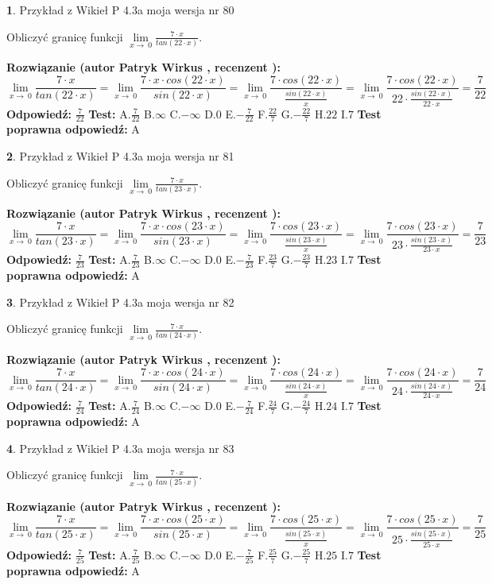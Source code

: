 \documentclass[12pt, a4paper]{article}
\theoremstyle{definition} %
\newtheorem{zad}{}
\newcommand{\zadStart}[1]{\begin{zad}#1\newline}
\newcommand{\zadStop}{\end{zad}}
\newcommand{\rozwStart}[2]{\noindent \textbf{Rozwiązanie (autor #1 , recenzent #2): }\newline}
\newcommand{\rozwStop}{\newline}
\newcommand{\odpStart}{\noindent \textbf{Odpowiedź:}\newline}
\newcommand{\odpStop}{\newline}
\newcommand{\testStart}{\noindent \textbf{Test:}\newline}
\newcommand{\testStop}{\newline}
\newcommand{\kluczStart}{\noindent \textbf{Test poprawna odpowiedź:}\newline}
\newcommand{\kluczStop}{\newline}
\begin{document}
\zadStart{Przykład z Wikieł P 4.3a moja wersja nr 80}


Obliczyć granicę funkcji $\lim\limits_{x\to\ 0}\frac{7 \cdot x}{tan(22 \cdot x)}$.
\zadStop
\rozwStart{Patryk Wirkus}{}
$$\lim\limits_{x\to\ 0}\frac{7 \cdot x}{tan(22 \cdot x)}=\lim\limits_{x\to\ 0}\frac{7 \cdot x \cdot cos(22 \cdot x)}{sin(22 \cdot x)}=\lim\limits_{x\to\ 0}\frac{7 \cdot cos(22 \cdot x)}{\frac{sin(22 \cdot x)}{x}}=\lim\limits_{x\to\ 0}\frac{7 \cdot cos(22 \cdot x)}{22 \cdot \frac{sin(22 \cdot x)}{22 \cdot x}} = \frac{7}{22}$$
\rozwStop
\odpStart
$\frac{7}{22}$
\odpStop
\testStart
A.$\frac{7}{22}$
B.$\infty$
C.$-\infty$
D.$0$
E.$-\frac{7}{22}$
F.$\frac{22}{7}$
G.$-\frac{22}{7}$
H.$22$
I.$7$
\testStop
\kluczStart
A
\kluczStop



\zadStart{Przykład z Wikieł P 4.3a moja wersja nr 81}


Obliczyć granicę funkcji $\lim\limits_{x\to\ 0}\frac{7 \cdot x}{tan(23 \cdot x)}$.
\zadStop
\rozwStart{Patryk Wirkus}{}
$$\lim\limits_{x\to\ 0}\frac{7 \cdot x}{tan(23 \cdot x)}=\lim\limits_{x\to\ 0}\frac{7 \cdot x \cdot cos(23 \cdot x)}{sin(23 \cdot x)}=\lim\limits_{x\to\ 0}\frac{7 \cdot cos(23 \cdot x)}{\frac{sin(23 \cdot x)}{x}}=\lim\limits_{x\to\ 0}\frac{7 \cdot cos(23 \cdot x)}{23 \cdot \frac{sin(23 \cdot x)}{23 \cdot x}} = \frac{7}{23}$$
\rozwStop
\odpStart
$\frac{7}{23}$
\odpStop
\testStart
A.$\frac{7}{23}$
B.$\infty$
C.$-\infty$
D.$0$
E.$-\frac{7}{23}$
F.$\frac{23}{7}$
G.$-\frac{23}{7}$
H.$23$
I.$7$
\testStop
\kluczStart
A
\kluczStop



\zadStart{Przykład z Wikieł P 4.3a moja wersja nr 82}


Obliczyć granicę funkcji $\lim\limits_{x\to\ 0}\frac{7 \cdot x}{tan(24 \cdot x)}$.
\zadStop
\rozwStart{Patryk Wirkus}{}
$$\lim\limits_{x\to\ 0}\frac{7 \cdot x}{tan(24 \cdot x)}=\lim\limits_{x\to\ 0}\frac{7 \cdot x \cdot cos(24 \cdot x)}{sin(24 \cdot x)}=\lim\limits_{x\to\ 0}\frac{7 \cdot cos(24 \cdot x)}{\frac{sin(24 \cdot x)}{x}}=\lim\limits_{x\to\ 0}\frac{7 \cdot cos(24 \cdot x)}{24 \cdot \frac{sin(24 \cdot x)}{24 \cdot x}} = \frac{7}{24}$$
\rozwStop
\odpStart
$\frac{7}{24}$
\odpStop
\testStart
A.$\frac{7}{24}$
B.$\infty$
C.$-\infty$
D.$0$
E.$-\frac{7}{24}$
F.$\frac{24}{7}$
G.$-\frac{24}{7}$
H.$24$
I.$7$
\testStop
\kluczStart
A
\kluczStop



\zadStart{Przykład z Wikieł P 4.3a moja wersja nr 83}


Obliczyć granicę funkcji $\lim\limits_{x\to\ 0}\frac{7 \cdot x}{tan(25 \cdot x)}$.
\zadStop
\rozwStart{Patryk Wirkus}{}
$$\lim\limits_{x\to\ 0}\frac{7 \cdot x}{tan(25 \cdot x)}=\lim\limits_{x\to\ 0}\frac{7 \cdot x \cdot cos(25 \cdot x)}{sin(25 \cdot x)}=\lim\limits_{x\to\ 0}\frac{7 \cdot cos(25 \cdot x)}{\frac{sin(25 \cdot x)}{x}}=\lim\limits_{x\to\ 0}\frac{7 \cdot cos(25 \cdot x)}{25 \cdot \frac{sin(25 \cdot x)}{25 \cdot x}} = \frac{7}{25}$$
\rozwStop
\odpStart
$\frac{7}{25}$
\odpStop
\testStart
A.$\frac{7}{25}$
B.$\infty$
C.$-\infty$
D.$0$
E.$-\frac{7}{25}$
F.$\frac{25}{7}$
G.$-\frac{25}{7}$
H.$25$
I.$7$
\testStop
\kluczStart
A
\kluczStop
\end{document}
